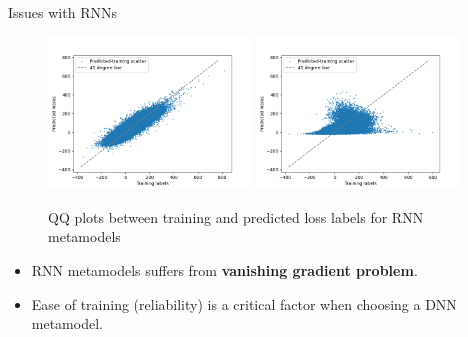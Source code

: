 \documentclass[9pt,handout]{beamer}
\begin{document}
\begin{frame}{Issues with RNNs}

    \begin{figure}[H]
        \includegraphics[width=0.48\textwidth]{../project2/figures/qqPlots/rnnGood_training.png}
        \includegraphics[width=0.48\textwidth]{../project2/figures/qqPlots/rnnBad_training.png}
        \caption{QQ plots between training and predicted loss labels for RNN metamodels}
    \end{figure}

    \begin{itemize}
        \item   RNN metamodels suffers from \textbf{vanishing gradient problem}.
        \item   Ease of training (reliability) is a critical factor when choosing a DNN metamodel.
    \end{itemize}

\end{frame}
\end{document}
